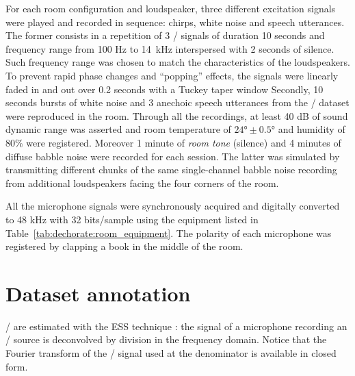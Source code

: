 \mynewline
For each room configuration and loudspeaker, three different excitation signals were played and recorded in sequence: chirps, white noise and speech utterances.
The former consists in a repetition of 3 \ESS/ signals of duration 10 seconds and frequency range from 100 Hz to 14~kHz interspersed with 2 seconds of silence.
Such frequency range was chosen to match the characteristics of the loudspeakers.
To prevent rapid phase changes and ``popping'' effects, the signals were linearly faded in and out over 0.2 seconds with a Tuckey taper window
Secondly, 10 seconds bursts of white noise and 3 anechoic speech utterances from the \WSJ/ dataset  were reproduced in the room. Through all the recordings, at least 40 dB of sound dynamic range was asserted and room temperature of $\ang{24} \pm \ang{0.5}$ and humidity of $80\%$ were registered. Moreover 1 minute of \textit{room tone} (silence) and 4 minutes of diffuse babble noise were recorded for each session. The latter was simulated by transmitting different chunks of the same single-channel babble noise recording from additional loudspeakers facing the four corners of the room.

\mynewline
All the microphone signals were synchronously acquired and digitally converted to 48 kHz with 32 bits/sample using the equipment listed in Table~\ref{tab:dechorate:room_equipment}. The polarity of each microphone was registered by clapping a book in the middle of the room.

\section{Dataset annotation}\label{sec:annotation}
\RIRs/ are estimated with the ESS technique : the signal of a microphone recording an \ESS/ source is deconvolved by division in the frequency domain.
Notice that the Fourier transform of the \ESS/ signal used at the denominator is available in closed form.

